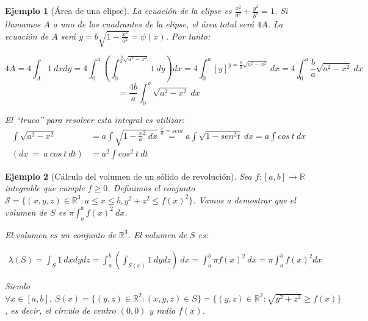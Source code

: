 \documentclass[11pt, a4paper]{article}
\newif\IfInSansMode
\newcommand{\R}{\mathbb{R}} \newcommand{\N}{\mathbb{N}}
\theoremstyle{theorem-style}
\theoremstyle{definition-style}
\theoremstyle{remark-style}
\theoremstyle{example-style}
\newtheorem{ejemplo}{Ejemplo}[section]
\begin{document}
\begin{ejemplo}[Área de una elipse]

La ecuación de la elipse es $\frac{x^2}{a^2} + \frac{y^2}{b^2} = 1$. Si llamamos
$A$ a uno de los cuadrantes de la elipse, el área total será $4A$. La ecuación
de $A$ será $y = b \sqrt{1 - \frac{x^2}{a^2}} = \psi(x)$. Por tanto:

$$4A = 4\int_A 1 \ dxdy = 4\int_{0}^{a}\left(\int_0^{\frac{b}{a}\sqrt{a^2-x^2}}
  1 \ dy \right) dx = 4 \int_0^{a}\left[y\right]^{y = \frac{b}{a}\sqrt{a^2-x^2}}
\ dx = 4 \int_0^{a} \frac{b}{a}\sqrt{a^2-x^2} \ dx$$
$$= \frac{4b}{a} \int_0^{a}\sqrt{a^2-x^2} \ dx$$

El ``truco'' para resolver esta integral es utilizar:
\begin{align*}
 \int \sqrt{a^2-x^2} &= a\int \sqrt{1 - \frac{x}{a}^2 \ dx} \overset{\frac{x}{a}
    = sen t}{=} a\int \sqrt{1 - sen^2 t} \ dx = a\int cos \ t \ dx \\
                    (dx \ = \ a \ cos \ t \ dt)   &= a^2\int cos^2 \ t \ dt
\end{align*}
\end{ejemplo}

\begin{ejemplo}[Cálculo del volumen de un sólido de revolución]
  Sea $f : [a, b] \rightarrow \R$ integrable que cumple $f \geq 0$. Definimos el
  conjunto $\mathcal S = \{ (x, y, z) \in \R^3 : a \leq x \leq b, y^2+z^2 \leq
  f(x)^2 \}$. Vamos a demostrar que el volumen de $S$ es $\pi \int_a^b f(x)^2 \
  dx$.

  El volumen es un conjunto de $\R^3$. El volumen de $S$ es:

  \begin{align*}
    \lambda(S) = \int_S 1 \ dxdydz = \int_a^b \left( \int_{S(x)} 1  \ dydz \right)
    \ dx = \int_a^b \pi f(x)^2 \ dx = \pi \int_a^b f(x)^2dx
  \end{align*}

  Siendo $\forall x \in [a, b], \ S(x) = \{ (y, z) \in \R^2 : (x, y, z) \in S \} = \{ (y,z) \in \R^2 :
  \sqrt{y^2+z^2} \geq f(x) \}$, es decir, el círculo de centro $(0,0)$ y radio $f(x)$.
\end{ejemplo}
\end{document}
